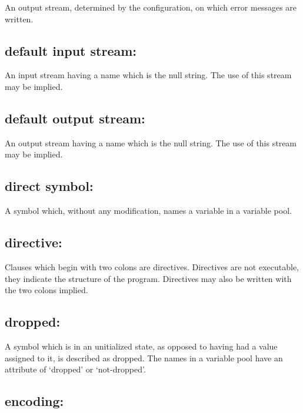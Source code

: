 An output stream, determined by the configuration, on which error
messages are written.

\hypertarget{default-input-stream}{%
\subsection{default input stream:}\label{default-input-stream}}

An input stream having a name which is the null string. The use of this
stream may be implied.

\hypertarget{default-output-stream}{%
\subsection{default output stream:}\label{default-output-stream}}

An output stream having a name which is the null string. The use of this
stream may be implied.

\hypertarget{direct-symbol}{%
\subsection{direct symbol:}\label{direct-symbol}}

A symbol which, without any modification, names a variable in a variable
pool.

\hypertarget{directive}{%
\subsection{directive:}\label{directive}}

Clauses which begin with two colons are directives. Directives are not
executable, they indicate the structure of the program. Directives may
also be written with the two colons implied.

\hypertarget{dropped}{%
\subsection{dropped:}\label{dropped}}

A symbol which is in an unitialized state, as opposed to having had a
value assigned to it, is described as dropped. The names in a variable
pool have an attribute of `dropped' or `not-dropped'.

\hypertarget{encoding}{%
\subsection{encoding:}\label{encoding}}

